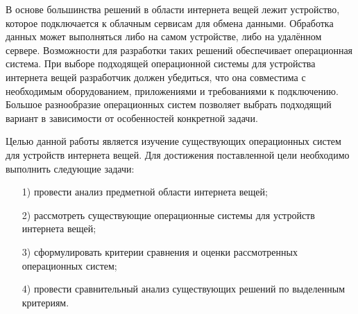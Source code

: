 В основе большинства решений в области интернета вещей лежит устройство, которое подключается к облачным сервисам для обмена данными. Обработка данных может выполняться либо на самом устройстве, либо на удалённом сервере. Возможности для разработки таких решений обеспечивает операционная система. При выборе подходящей операционной системы для устройства интернета вещей разработчик должен убедиться, что она совместима с необходимым оборудованием, приложениями и требованиями к подключению. Большое разнообразие операционных систем позволяет выбрать подходящий вариант в зависимости от особенностей конкретной задачи.

Целью данной работы является изучение существующих операционных систем для устройств интернета вещей. Для достижения поставленной цели необходимо выполнить следующие задачи:

\begin{enumerate}
	\item[1)] провести анализ предметной области интернета вещей;
	\item[2)] рассмотреть существующие операционные системы для устройств интернета вещей;
	\item[3)] сформулировать критерии сравнения и оценки рассмотренных операционных систем;
	\item[4)] провести сравнительный анализ существующих решений по выделенным критериям. 
\end{enumerate}

